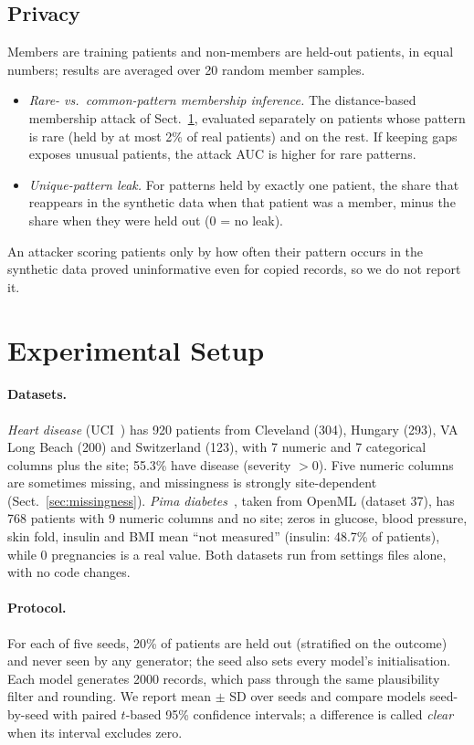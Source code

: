 \documentclass[runningheads]{llncs}
\begin{document}
\subsection{Privacy}

Members are training patients and non-members are held-out patients, in
equal numbers; results are averaged over 20 random member samples.
\begin{itemize}
\item \emph{Rare- vs.\ common-pattern membership inference.} The
  distance-based membership attack of Sect.~\ref{sec:setup}, evaluated
  separately on patients whose pattern is rare (held by at most 2\% of real
  patients) and on the rest. If keeping gaps exposes unusual patients, the
  attack AUC is higher for rare patterns.
\item \emph{Unique-pattern leak.} For patterns held by exactly one patient,
  the share that reappears in the synthetic data when that patient was a
  member, minus the share when they were held out (0 = no leak).
\end{itemize}
An attacker scoring patients only by how often their pattern occurs in the
synthetic data proved uninformative even for copied records, so we do not
report it.

\section{Experimental Setup}
\label{sec:setup}

\paragraph{Datasets.}
\emph{Heart disease} (UCI~\cite{janosi1989heart}) has 920 patients from Cleveland (304), Hungary
(293), VA Long Beach (200) and Switzerland (123), with 7 numeric and 7
categorical columns plus the site; 55.3\% have disease (severity
$> 0$). Five numeric columns are sometimes missing, and missingness is
strongly site-dependent (Sect.~\ref{sec:missingness}). \emph{Pima
diabetes}~\cite{smith1988adap}, taken from OpenML (dataset
37), has 768 patients with 9 numeric columns and
no site; zeros in glucose, blood pressure, skin fold, insulin and BMI mean
``not measured'' (insulin: 48.7\% of patients), while 0 pregnancies is a
real value. Both datasets run from settings files alone, with no code
changes.

\paragraph{Protocol.}
For each of five seeds, 20\% of patients are held out (stratified on the
outcome) and never seen by any generator; the seed also sets every model's
initialisation. Each model generates 2000 records, which pass through the
same plausibility filter and rounding. We report mean $\pm$ SD over seeds
and compare models seed-by-seed with paired $t$-based 95\% confidence
intervals; a difference is called \emph{clear} when its interval excludes
zero.
\end{document}
